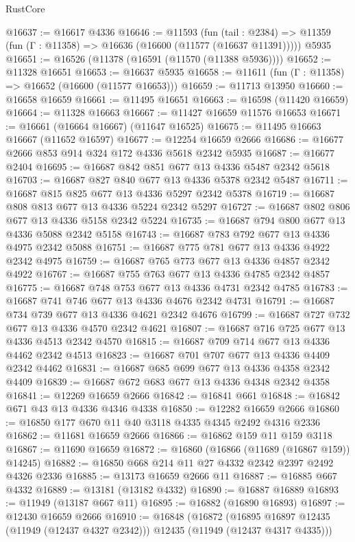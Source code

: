\begin{lexlean}{RustCore}
\begin{coremodule}
@16637 := @16617 @4336
@16646 := @11593
    (fun (tail : @2384) => @11359 (fun (Γ : @11358) => @16636 (@16600 (@11577 (@16637 @11391)))))
    @5935
@16651 := @16526 (@11378 (@16591 (@11570 (@11388 @5936))))
@16652 := @11328 @16651
@16653 := @16637 @5935
@16658 := @11611 (fun (Γ : @11358) => @16652 (@16600 (@11577 @16653)))
@16659 := @11713 @13950
@16660 := @16658 @16659
@16661 := @11495 @16651
@16663 := @16598 (@11420 @16659)
@16664 := @11328 @16663
@16667 := @11427 @16659 @11576 @16653
@16671 := @16661 (@16664 @16667) (@11647 @16525)
@16675 := @11495 @16663 @16667 (@11652 @16597)
@16677 := @12254 @16659 @2666
@16686 := @16677 @2666 @853 @914 @324 @172 @4336 @5618 @2342 @5935
@16687 := @16677 @2404
@16695 := @16687 @842 @851 @677 @13 @4336 @5487 @2342 @5618
@16703 := @16687 @827 @840 @677 @13 @4336 @5378 @2342 @5487
@16711 := @16687 @815 @825 @677 @13 @4336 @5297 @2342 @5378
@16719 := @16687 @808 @813 @677 @13 @4336 @5224 @2342 @5297
@16727 := @16687 @802 @806 @677 @13 @4336 @5158 @2342 @5224
@16735 := @16687 @794 @800 @677 @13 @4336 @5088 @2342 @5158
@16743 := @16687 @783 @792 @677 @13 @4336 @4975 @2342 @5088
@16751 := @16687 @775 @781 @677 @13 @4336 @4922 @2342 @4975
@16759 := @16687 @765 @773 @677 @13 @4336 @4857 @2342 @4922
@16767 := @16687 @755 @763 @677 @13 @4336 @4785 @2342 @4857
@16775 := @16687 @748 @753 @677 @13 @4336 @4731 @2342 @4785
@16783 := @16687 @741 @746 @677 @13 @4336 @4676 @2342 @4731
@16791 := @16687 @734 @739 @677 @13 @4336 @4621 @2342 @4676
@16799 := @16687 @727 @732 @677 @13 @4336 @4570 @2342 @4621
@16807 := @16687 @716 @725 @677 @13 @4336 @4513 @2342 @4570
@16815 := @16687 @709 @714 @677 @13 @4336 @4462 @2342 @4513
@16823 := @16687 @701 @707 @677 @13 @4336 @4409 @2342 @4462
@16831 := @16687 @685 @699 @677 @13 @4336 @4358 @2342 @4409
@16839 := @16687 @672 @683 @677 @13 @4336 @4348 @2342 @4358
@16841 := @12269 @16659 @2666
@16842 := @16841 @661
@16848 := @16842 @671 @43 @13 @4336 @4346 @4338
@16850 := @12282 @16659 @2666
@16860 := @16850 @177 @670 @11 @40 @3118 @4335 @4345 @2492 @4316 @2336
@16862 := @11681 @16659 @2666
@16866 := @16862 @159 @11 @159 @3118
@16867 := @11690 @16659
@16872 := @16860 (@16866 (@11689 (@16867 @159)) @14245)
@16882 := @16850 @668 @214 @11 @27 @4332 @2342 @2397 @2492 @4326 @2336
@16885 := @13173 @16659 @2666 @11
@16887 := @16885 @667 @4332
@16889 := @13181 (@13182 @4332)
@16890 := @16887 @16889
@16893 := @11949 (@13187 @667 @11)
@16895 := @16882 (@16890 @16893)
@16897 := @12430 @16659 @2666
@16910 := @16848
    (@16872
      (@16895 @16897 @12435 (@11949 (@12437 @4327 @2342)))
      @12435
      (@11949 (@12437 @4317 @4335)))

\end{coremodule}
\end{lexlean}
